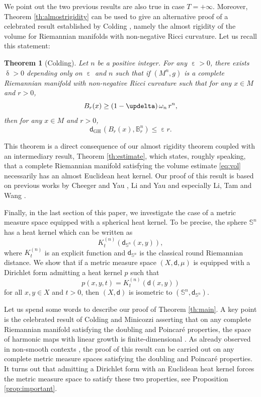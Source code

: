 \documentclass[JEP,XML,SOM,Unicode,published]{cedram}
\newcommand{\sGH}{{\scriptscriptstyle\mathrm{GH}\,}}
\newcommand{\NoChangel}[1]{%
\expandafter\let\csname old\string#1\endcsname=#1
\let#1=\relax
\newcommand{#1}{\mathcode`l="716C\csname old\string#1\endcsname\mathcode`l="7160 }%
}
\theoremstyle{plain}
\newtheorem{theorem}{Theorem}[section]
\theoremstyle{definition}
\newcommand{\setB}{\mathbb{B}}
\newcommand{\dist}{\mathsf{d}}
\DeclareMathOperator{\vol}{vol}\NoChangel{\vol}
\begin{document}
We point out the two previous results are also true in case $T=+\infty$. Moreover, Theorem \ref{th:almostrigidity} can be used to give an alternative proof of a celebrated result established by Colding \cite[Th.\,0.8]{Colding}, namely the almost rigidity of the volume for Riemannian manifolds with non-negative Ricci curvature. Let us recall this statement:

\begin{theorem}[Colding]\label{th:Colding} Let $n$ be a positive integer. For any $\upepsilon>0$, there exists $\updelta>0$ depending only on $\upepsilon$ and $n$ such that if
$(M^n,g)$ is a complete Riemannian manifold with non-negative Ricci curvature such that for any $x \in M$ and $r>0$,
\begin{equation}\label{eq:vol}\vol B_r(x) \ge \left(1-\updelta\right) \omega_n\, r^n,\end{equation}
then for
any $x\in M$ and $r>0$,
\[
\dist_{\sGH}\left(B_r(x), \setB^n_r\right)\le \upepsilon r.
\]
\end{theorem}

This theorem is a direct consequence of our almost rigidity theorem coupled with an intermediary result, Theorem \ref{th:estimate}, which states, roughly speaking, that a complete Riemannian manifold satisfying the volume estimate \eqref{eq:vol} necessarily has an almost Euclidean heat kernel. Our proof of this result is based on previous works by Cheeger and Yau \cite{CheegerYau}, Li and Yau \cite{LiYau} and especially Li, Tam and Wang \cite{LiTamWang}.

Finally, in the last section of this paper, we investigate the case of a metric measure space equipped with a spherical heat kernel. To be precise, the sphere $\mathbb{S}^n$ has a heat kernel which can be written as
\[
K_t^{(n)}(\dist_{\mathbb{S}^n}(x,y)),
\]
where $K_t^{(n)}$ is an explicit function and $\dist_{\mathbb{S}^n}$ is the classical round Riemannian distance. We show that if a metric measure space $(X,\dist,\mu)$ is equipped with a Dirichlet form admitting a heat kernel $p$ such that
\[
p(x,y,t)=K_t^{(n)}(\dist(x,y))
\]
for all $x, y \in X$ and $t>0$, then $(X,\dist)$ is isometric to $(\mathbb{S}^n,\dist_{\mathbb{S}^n})$.

Let us spend some words to describe our proof of Theorem \ref{th:main}. A key point is the celebrated result of Colding and Minicozzi asserting that on any complete Riemannian manifold satisfying the doubling and Poincaré properties, the space of harmonic maps with linear growth is finite-dimensional \cite{ColdingMinicozzi}. As already observed in non-smooth contexts \cite{Hua, HuaKellXia}, the proof of this result can be carried out on any complete metric measure spaces satisfying the doubling and Poincaré properties. It turns out that admitting a Dirichlet form with an Euclidean heat kernel forces the metric measure space to satisfy these two properties, see Proposition \ref{prop:important}.
\end{document}

